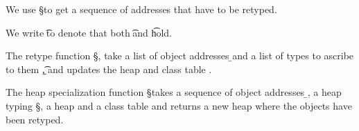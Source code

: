 \documentclass[a4paper,USenglish]{tex/lipics-v2016}
\begin{document}
We use \Dom\S to get a sequence of addresses that have to be retyped.

\begin{mathpar}
\end{mathpar}


We write \t\EQ\tp to denote that both \StrSub{}\K\t\tp and
\StrSub{}\K\tp\t hold.

The retype function \retype{\b\a}{\b\t}\S\s\K, take a list of object
addresses \b\a and a list of types to ascribe to them \b\t, and updates the
heap \s and class table \K.


\begin{mathpar}


\end{mathpar}

The heap specialization function \spec{\b\a}\S\s\K takes a
sequence of object addresses \b\a, a heap typing \S, a heap \s
and a class table \K and returns a new heap where the objects
have been retyped.

\begin{mathpar}

\end{mathpar}
\end{document}
